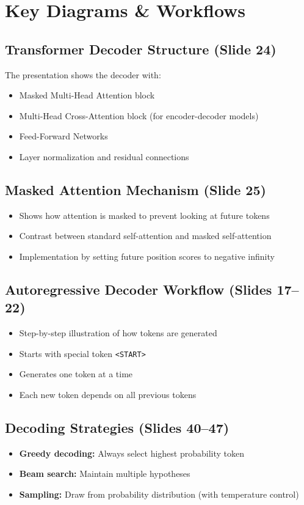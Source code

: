 \section{Key Diagrams \& Workflows}

\subsection*{Transformer Decoder Structure (Slide 24)}
The presentation shows the decoder with:
\begin{itemize}
    \item Masked Multi-Head Attention block
    \item Multi-Head Cross-Attention block (for encoder-decoder models)
    \item Feed-Forward Networks
    \item Layer normalization and residual connections
\end{itemize}

\subsection*{Masked Attention Mechanism (Slide 25)}
\begin{itemize}
    \item Shows how attention is masked to prevent looking at future tokens
    \item Contrast between standard self-attention and masked self-attention
    \item Implementation by setting future position scores to negative infinity
\end{itemize}

\subsection*{Autoregressive Decoder Workflow (Slides 17--22)}
\begin{itemize}
    \item Step-by-step illustration of how tokens are generated
    \item Starts with special token \texttt{<START>}
    \item Generates one token at a time
    \item Each new token depends on all previous tokens
\end{itemize}

\subsection*{Decoding Strategies (Slides 40--47)}
\begin{itemize}
    \item \textbf{Greedy decoding:} Always select highest probability token
    \item \textbf{Beam search:} Maintain multiple hypotheses
    \item \textbf{Sampling:} Draw from probability distribution (with temperature control)
\end{itemize}
